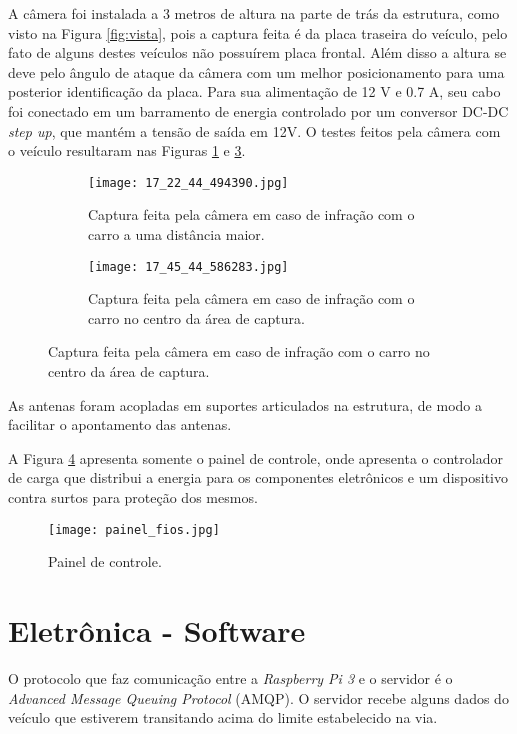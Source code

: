 A câmera foi instalada a 3 metros de altura na parte de trás da estrutura, como visto na Figura \ref{fig:vista}, pois a captura feita é da placa traseira do veículo, pelo fato de alguns destes veículos não possuírem placa frontal. Além disso a altura se deve pelo ângulo de ataque da câmera com um melhor posicionamento para uma posterior identificação da placa. Para sua alimentação de 12 V e 0.7 A, seu cabo foi conectado em um barramento de energia controlado por um conversor DC-DC \emph{step up}, que mantém a tensão de saída em 12V.  O testes feitos pela câmera com o veículo resultaram nas Figuras \ref{car1} e \ref{car2}.

\begin{figure}[H]
     \centering
     
     \begin{subfigure}{0.6\textwidth}
         \texttt{[image: 17\_22\_44\_494390.jpg]}
         \caption{Captura feita pela câmera em caso de infração com o carro a uma distância maior.}
         \label{car1}
     \end{subfigure}

     \begin{subfigure}{0.6\textwidth}
         \texttt{[image: 17\_45\_44\_586283.jpg]}
          \caption{Captura feita pela câmera em caso de infração com o carro no centro da área de captura.}
         \label{car2}
     \end{subfigure}
\end{figure}

As antenas foram acopladas em suportes articulados na estrutura, de modo a facilitar o apontamento das antenas.

A Figura \ref{fig:painel_controle} apresenta somente o painel de controle, onde apresenta o controlador de carga que distribui a energia para os componentes eletrônicos e um dispositivo contra surtos para proteção dos mesmos.

\begin{figure}[H]
    \centering
    \texttt{[image: painel\_fios.jpg]}
    \caption{Painel de controle.}
    \label{fig:painel_controle}
\end{figure}


\section{Eletrônica - Software}

O protocolo que faz comunicação entre a \emph{Raspberry Pi 3} e o servidor é o \emph{Advanced Message Queuing Protocol} (AMQP). O servidor recebe alguns dados do veículo que estiverem transitando acima do limite estabelecido na via. 


